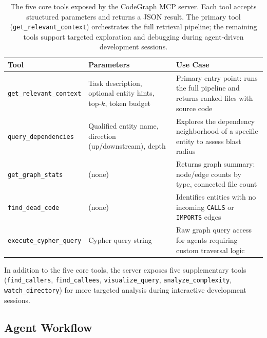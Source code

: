 \begin{table}[H]
    \centering
    \caption[MCP tool reference]{The five core tools exposed by the CodeGraph MCP server. Each tool accepts structured parameters and returns a JSON result. The primary tool (\texttt{get\_relevant\_context}) orchestrates the full retrieval pipeline; the remaining tools support targeted exploration and debugging during agent-driven development sessions.}
    \label{tab:mcp-tools}
    \begin{tabularx}{\textwidth}{l X X}
        \toprule
        \textbf{Tool}                   & \textbf{Parameters}                                            & \textbf{Use Case}                                                                     \\
        \midrule
        \texttt{get\_relevant\_context} & Task description, optional entity hints, top-$k$, token budget & Primary entry point: runs the full pipeline and returns ranked files with source code \\
        \addlinespace[4pt]
        \texttt{query\_dependencies}    & Qualified entity name, direction (up/downstream), depth        & Explores the dependency neighborhood of a specific entity to assess blast radius      \\
        \addlinespace[4pt]
        \texttt{get\_graph\_stats}      & (none)                                                         & Returns graph summary: node/edge counts by type, connected file count                 \\
        \addlinespace[4pt]
        \texttt{find\_dead\_code}       & (none)                                                         & Identifies entities with no incoming \texttt{CALLS} or \texttt{IMPORTS} edges         \\
        \addlinespace[4pt]
        \texttt{execute\_cypher\_query} & Cypher query string                                            & Raw graph query access for agents requiring custom traversal logic                    \\
        \bottomrule
    \end{tabularx}
\end{table}

In addition to the five core tools, the server exposes five supplementary tools (\texttt{find\_callers}, \texttt{find\_callees}, \texttt{visualize\_query}, \texttt{analyze\_complexity}, \texttt{watch\_directory}) for more targeted analysis during interactive development sessions.


\subsection{Agent Workflow}
\label{sec:agent-workflow}


